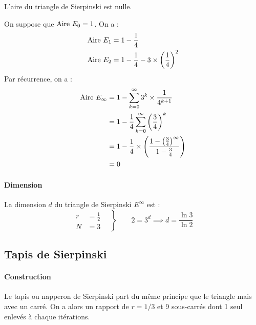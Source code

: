 			\begin{propShort}
				L'aire du triangle de Sierpinski est nulle.
			\end{propShort}
			\begin{preuve}
				On suppose que $\text{Aire}~ E_0 = 1$.
				On a :
				\begin{align*}
					\text{Aire}~ E_1 &= 1 - \frac{1}{4}		\\
					\text{Aire}~ E_2 &= 1 - \frac{1}{4} - 3\times\left(\frac{1}{4}\right)^2 \\
				\end{align*}
				Par récurrence, on a :
				\begin{align*}
					\text{Aire}~ E_\infty
						&= 1 - \sum_{k=0}^\infty 3^k \times \frac{1}{4^{k+1}} \\
						&= 1 - \frac{1}{4} \sum_{k=0}^\infty \left(\frac{3}{4}\right)^k		\\
						&= 1 - \frac{1}{4} \times \left( \frac{1- \left( \frac{3}{4} \right)^\infty}{1 - \frac{3}{4}} \right)	\\
						&= 	0
				\end{align*}
			\end{preuve}


		\paragraph{Dimension}

			La dimension $d$ du triangle de Sierpinski $E^\infty$ est :
			$$
				\left.\begin{aligned}
					r &= \frac{1}{2}	\quad	\\
					N &= 3	\quad
					\end{aligned}
				\right\}
				\qquad 2=3^d \implies d= \frac{\ln{3}}{\ln{2}}
			$$


	\subsection{Tapis de Sierpinski}

		\paragraph{Construction}
		
			Le tapis ou napperon de Sierpinski part du même principe que le triangle mais avec un carré. On a alors un rapport de $r=1/3$ et 9 sous-carrés dont 1 seul enlevés à chaque itérations.

